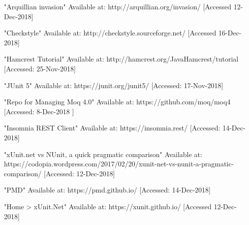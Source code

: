  "Arquillian invasion" Available at: http://arquillian.org/invasion/ [Accessed 12-Dec-2018]

 "Checkstyle" Available at: http://checkstyle.sourceforge.net/ [Accessed 16-Dec-2018]

 "Hamcrest Tutorial" Available at: http://hamcrest.org/JavaHamcrest/tutorial [Accessed: 25-Nov-2018]

 "JUnit 5" Available at: https://junit.org/junit5/ [Accessed: 17-Nov-2018]

 "Repo for Managing Moq 4.0"
Available at: https://github.com/moq/moq4 [Accessed: 8-Dec-2018 ]

 "Insomnia REST Client" Available at: https://insomnia.rest/ [Accessed: 14-Dec-2018]

 "xUnit.net vs NUnit, a quick pragmatic comparison" Available at: https://codopia.wordpress.com/2017/02/20/xunit-net-vs-nunit-a-pragmatic-comparison/ [Accessed: 12-Dec-2018]

 "PMD" Available at: https://pmd.github.io/ [Accessed: 14-Dec-2018]

 "Home > xUnit.Net"
Available at: https://xunit.github.io/ [Accessed 12-Dec-2018]
